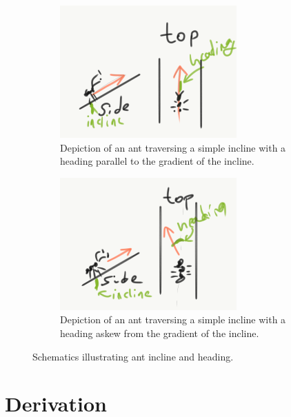 \documentclass{article}
\begin{document}
\begin{figure}
    \centering
    \begin{subfigure}[t]{0.4\textwidth}
        \centering
        \includegraphics[height=2in]{ant_straight}
        \caption{Depiction of an ant traversing a simple incline with a heading parallel to the gradient of the incline.}
        \label{fig:ant_straight}
    \end{subfigure}
    \begin{subfigure}[t]{0.4\textwidth}
        \centering
        \includegraphics[height=2in]{ant_notstraight}
        \caption{Depiction of an ant traversing a simple incline with a heading askew from the gradient of the incline.}
        \label{fig:ant_notstraight}
    \end{subfigure}
    \caption{Schematics illustrating ant incline and heading.}
    \label{fig:ant_incline_heading}
\end{figure}

\section{Derivation} \label{sec:derivation}
\end{document}
